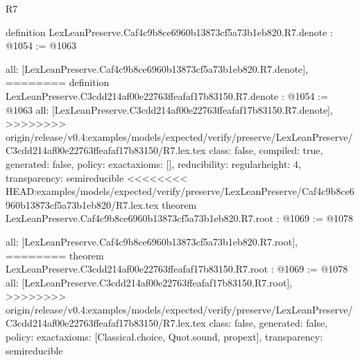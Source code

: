 \begin{lexlean}{R7}
\begin{coremodule}
{{{{{{{{{{{definition LexLeanPreserve.Caf4c9b8ce6960b13873cf5a73b1eb820.R7.denote : @1054 := @1063 {
  all: [LexLeanPreserve.Caf4c9b8ce6960b13873cf5a73b1eb820.R7.denote],
========
definition LexLeanPreserve.C3cdd214af00e22763ffeafaf17b83150.R7.denote : @1054 := @1063 {
  all: [LexLeanPreserve.C3cdd214af00e22763ffeafaf17b83150.R7.denote],
>>>>>>>> origin/release/v0.4:examples/models/expected/verify/preserve/LexLeanPreserve/C3cdd214af00e22763ffeafaf17b83150/R7.lex.tex
  class: false,
  compiled: true,
  generated: false,
  policy: exact{axioms: []},
  reducibility: regular{height: 4},
  transparency: semireducible
}
<<<<<<<< HEAD:examples/models/expected/verify/preserve/LexLeanPreserve/Caf4c9b8ce6960b13873cf5a73b1eb820/R7.lex.tex
theorem LexLeanPreserve.Caf4c9b8ce6960b13873cf5a73b1eb820.R7.root : @1069 := @1078 {
  all: [LexLeanPreserve.Caf4c9b8ce6960b13873cf5a73b1eb820.R7.root],
========
theorem LexLeanPreserve.C3cdd214af00e22763ffeafaf17b83150.R7.root : @1069 := @1078 {
  all: [LexLeanPreserve.C3cdd214af00e22763ffeafaf17b83150.R7.root],
>>>>>>>> origin/release/v0.4:examples/models/expected/verify/preserve/LexLeanPreserve/C3cdd214af00e22763ffeafaf17b83150/R7.lex.tex
  class: false,
  generated: false,
  policy: exact{axioms: [Classical.choice, Quot.sound, propext]},
  transparency: semireducible
}

}}}}}}}}}}}}}
\end{coremodule}
\end{lexlean}
